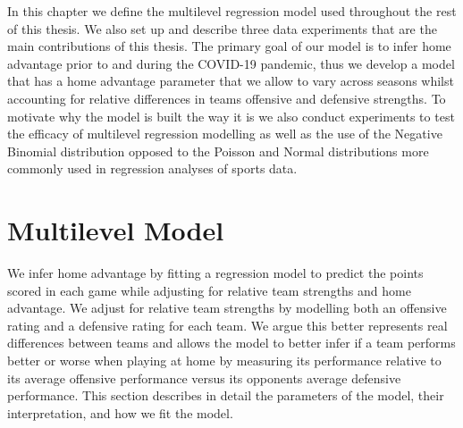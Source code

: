 In this chapter we define the multilevel regression model used throughout the rest of this thesis. We also set up and describe three data experiments that are the main contributions of this thesis. The primary goal of our model is to infer home advantage prior to and during the COVID-19 pandemic, thus we develop a model that has a home advantage parameter that we allow to vary across seasons whilst accounting for relative differences in teams offensive and defensive strengths. To motivate why the model is built the way it is we also conduct experiments to test the efficacy of multilevel regression modelling as well as the use of the Negative Binomial distribution opposed to the Poisson and Normal distributions more commonly used in regression analyses of sports data.

\section{Multilevel Model} \label{multilevel_model}

We infer home advantage by fitting a regression model to predict the points scored in each game while adjusting for relative team strengths and home advantage. We adjust for relative team strengths by modelling both an offensive rating and a defensive rating for each team. We argue this better represents real differences between teams and allows the model to better infer if a team performs better or worse when playing at home by measuring its performance relative to its average offensive performance versus its opponents average defensive performance. This section describes in detail the parameters of the model, their interpretation, and how we fit the model.

